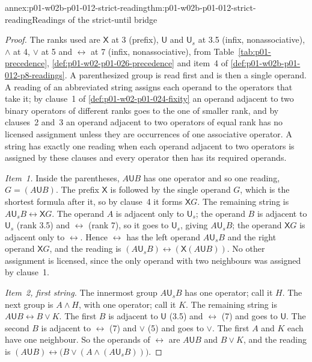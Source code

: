 \begin{annexitem}{annex:p01-w02b-p01-012-strict-reading}{thm:p01-w02b-p01-012-strict-reading}{Readings of the strict-until bridge}
\begin{proof}
The ranks used are \(\mathsf X\) at 3 (prefix), \(\mathsf U\) and
\(\mathsf U_s\) at 3.5 (infix, nonassociative), \(\land\) at 4, \(\lor\)
at 5 and \(\leftrightarrow\) at 7 (infix, nonassociative), from
Table~\ref{tab:p01-precedence}, \cref{def:p01-w02-p01-026-precedence} and
item~4 of \cref{def:p01-w02b-p01-012-p8-readings}.  A parenthesized group is read
first and is then a single operand.  A reading of an abbreviated string
assigns each operand to the operators that take it; by clause~1 of
\cref{def:p01-w02-p01-024-fixity} an operand adjacent to two binary
operators of different ranks goes to the one of smaller rank, and by
clauses~2 and~3 an operand adjacent to two operators of equal rank has no
licensed assignment unless they are occurrences of one associative
operator.  A string has exactly one reading when each operand adjacent to
two operators is assigned by these clauses and every operator then has
its required operands.

\emph{Item~1.}  Inside the parentheses, \(A\mathbin{\mathsf U}B\) has one
operator and so one reading, \(G=(A\mathbin{\mathsf U}B)\).  The prefix
\(\mathsf X\) is followed by the single operand \(G\), which is the
shortest formula after it, so by clause~4 it forms \(\mathsf XG\).  The
remaining string is \(A\mathbin{\mathsf U_s}B\leftrightarrow\mathsf XG\).
The operand \(A\) is adjacent only to \(\mathsf U_s\); the operand \(B\)
is adjacent to \(\mathsf U_s\) (rank 3.5) and \(\leftrightarrow\)
(rank 7), so it goes to \(\mathsf U_s\), giving
\(A\mathbin{\mathsf U_s}B\); the operand \(\mathsf XG\) is adjacent only
to \(\leftrightarrow\).  Hence \(\leftrightarrow\) has the left operand
\(A\mathbin{\mathsf U_s}B\) and the right operand \(\mathsf XG\), and the
reading is
\((A\mathbin{\mathsf U_s}B)\leftrightarrow(\mathsf X(A\mathbin{\mathsf U}B))\).
No other assignment is licensed, since the only operand with two
neighbours was assigned by clause~1.

\emph{Item~2, first string.}  The innermost group
\(A\mathbin{\mathsf U_s}B\) has one operator; call it \(H\).  The next
group is \(A\land H\), with one operator; call it \(K\).  The remaining
string is \(A\mathbin{\mathsf U}B\leftrightarrow B\lor K\).  The first
\(B\) is adjacent to \(\mathsf U\) (3.5) and \(\leftrightarrow\) (7) and
goes to \(\mathsf U\).  The second \(B\) is adjacent to
\(\leftrightarrow\) (7) and \(\lor\) (5) and goes to \(\lor\).  The first
\(A\) and \(K\) each have one neighbour.  So the operands of
\(\leftrightarrow\) are \(A\mathbin{\mathsf U}B\) and \(B\lor K\), and
the reading is
\((A\mathbin{\mathsf U}B)\leftrightarrow\bigl(B\lor(A\land(A\mathbin{\mathsf U_s}B))\bigr)\).


\end{proof}
\end{annexitem}
